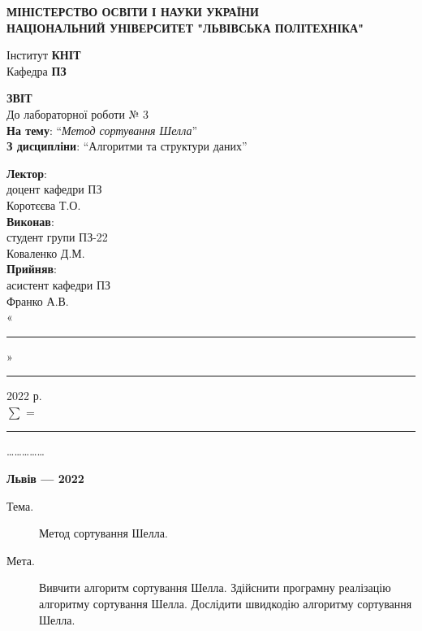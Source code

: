 \documentclass{article}
\newcommand\subject{Алгоритми та структури даних}
\newcommand\lecturer{доцент кафедри ПЗ\\Коротєєва Т.О.}
\newcommand\teacher{асистент кафедри ПЗ\\Франко А.В.}
\newcommand\mygroup{ПЗ-22}
\newcommand\lab{3}
\newcommand\theme{Метод сортування Шелла}
\newcommand\purpose{Вивчити алгоритм сортування Шелла. Здійснити програмну реалізацію алгоритму сортування Шелла. Дослідити швидкодію алгоритму сортування Шелла}
\begin{document}
	\begin{normalsize}
		\begin{titlepage}
			\thispagestyle{empty}
			\begin{center}
				\textbf{МІНІСТЕРСТВО ОСВІТИ І НАУКИ УКРАЇНИ\\
					НАЦІОНАЛЬНИЙ УНІВЕРСИТЕТ "ЛЬВІВСЬКА ПОЛІТЕХНІКА"}
			\end{center}
			\begin{flushright}
				Інститут \textbf{КНІТ}\\
				Кафедра \textbf{ПЗ}
			\end{flushright}
			\vspace{200pt}
			\begin{center}
				\textbf{ЗВІТ}\\
				\vspace{10pt}
				До лабораторної роботи № \lab\\
				\textbf{На тему}: “\textit{\theme}”\\
				\textbf{З дисципліни}: “\subject”
			\end{center}
			\vspace{112pt}
			\begin{flushright}
				
				\textbf{Лектор}:\\
				\lecturer\\
				\vspace{28pt}
				\textbf{Виконав}:\\
				
				студент групи \mygroup\\
				Коваленко Д.М.\\
				\vspace{28pt}
				\textbf{Прийняв}:\\
				
				\teacher\\
				
				\vspace{28pt}
				«\rule{1cm}{0.15mm}» \rule{1.5cm}{0.15mm} 2022 р.\\
				$\sum$ = \rule{1cm}{0.15mm}……………\\
				
			\end{flushright}
			\vspace{\fill}
			\begin{center}
				\textbf{Львів — 2022}
			\end{center}
		\end{titlepage}
		
		\begin{description}
			\item[Тема.] \theme.
			\item[Мета.] \purpose.
		\end{description}
		

\end{normalsize}
\end{document}
